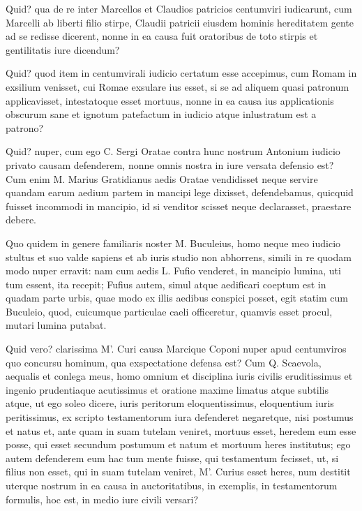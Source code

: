  Quid? qua de re inter Marcellos et Claudios patricios centumviri iudicarunt, cum Marcelli ab liberti filio stirpe, Claudii patricii eiusdem hominis hereditatem gente ad se redisse dicerent, nonne in ea causa fuit oratoribus de toto stirpis et gentilitatis iure dicendum?

 Quid? quod item in centumvirali iudicio certatum esse accepimus, cum Romam in exsilium venisset, cui Romae exsulare ius esset, si se ad aliquem quasi patronum applicavisset, intestatoque esset mortuus, nonne in ea causa ius applicationis obscurum sane et ignotum patefactum in iudicio atque inlustratum est a patrono?

 Quid? nuper, cum ego C. Sergi Oratae contra hunc nostrum Antonium iudicio privato causam defenderem, nonne omnis nostra in iure versata defensio est? Cum enim M. Marius Gratidianus aedis Oratae vendidisset neque servire quandam earum aedium partem in mancipi lege dixisset, defendebamus, quicquid fuisset incommodi in mancipio, id si venditor scisset neque declarasset, praestare debere.

 Quo quidem in genere familiaris noster M. Buculeius, homo neque meo iudicio stultus et suo valde sapiens et ab iuris studio non abhorrens, simili in re quodam modo nuper erravit: nam cum aedis L. Fufio venderet, in mancipio lumina, uti tum essent, ita recepit; Fufius autem, simul atque aedificari coeptum est in quadam parte urbis, quae modo ex illis aedibus conspici posset, egit statim cum Buculeio, quod, cuicumque particulae caeli officeretur, quamvis esset procul, mutari lumina putabat.

 Quid vero? clarissima M'. Curi causa Marcique Coponi nuper apud centumviros quo concursu hominum, qua exspectatione defensa est? Cum Q. Scaevola, aequalis et conlega meus, homo omnium et disciplina iuris civilis eruditissimus et ingenio prudentiaque acutissimus et oratione maxime limatus atque subtilis atque, ut ego soleo dicere, iuris peritorum eloquentissimus, eloquentium iuris peritissimus, ex scripto testamentorum iura defenderet negaretque, nisi postumus et natus et, ante quam in suam tutelam veniret, mortuus esset, heredem eum esse posse, qui esset secundum postumum et natum et mortuum heres institutus; ego autem defenderem eum hac tum mente fuisse, qui testamentum fecisset, ut, si filius non esset, qui in suam tutelam veniret, M'. Curius esset heres, num destitit uterque nostrum in ea causa in auctoritatibus, in exemplis, in testamentorum formulis, hoc est, in medio iure civili versari?

